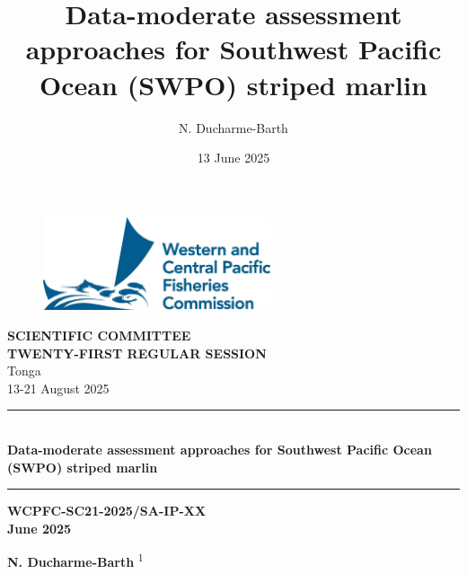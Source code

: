 \documentclass[
  11pt,
]{SCreport}
\title{Data-moderate assessment approaches for Southwest Pacific Ocean
(SWPO) striped marlin}
\author{N. Ducharme-Barth}
\date{13 June 2025}
\renewcommand*\contentsname{Table of contents}
\newcommand\contentsname{Table of contents}
\begin{document}
    \thispagestyle{empty}
    \begin{center}
        \begin{figure}
        \begin{center}
            \vspace{-2ex}
            \includegraphics[width=190pt]{static/wcpfc-logo.jpg}\\[-2ex]
        \end{center}
        \end{figure}
        \singlespace
        \textbf{\sffamily\small SCIENTIFIC COMMITTEE\\TWENTY-FIRST
REGULAR SESSION}\\[3ex]
        \textsf{Tonga}\\
        \textsf{13-21 August 2025}\\
        \rule{\textwidth}{0.5mm}\\
        \textbf{\sffamily Data-moderate assessment approaches for
Southwest Pacific Ocean (SWPO) striped marlin}\\[-1.5ex]
        \rule{\textwidth}{0.5mm}
    \end{center}

    \vspace{-1ex}
    \begin{flushright}
      \textbf{\sffamily WCPFC-SC21-2025/SA-IP-XX}\\
      \textbf{ June 2025}
    \end{flushright}
    \vspace{2in}
    \begin{center}
            \textbf{\sffamily N. Ducharme-Barth}%
                    \textsuperscript{1}%
            \end{center}
    
    
    \clearpage

\renewcommand*\contentsname{Table of contents}
{
\hypersetup{linkcolor=SCblue}
\setcounter{tocdepth}{3}
\tableofcontents
}

\newpage
\end{document}

